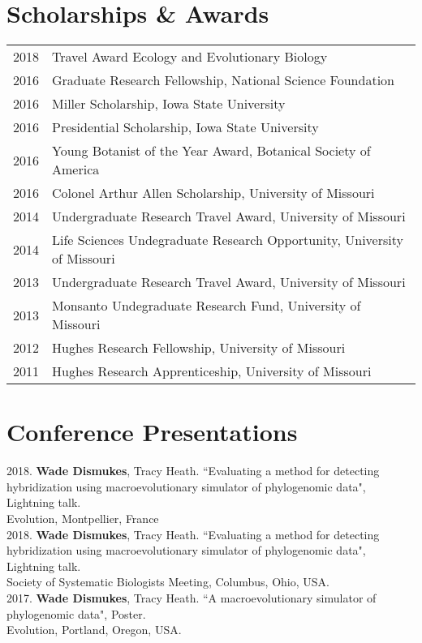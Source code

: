 \documentclass[12pt]{article}
\begin{document}
\section{Scholarships \& Awards}
\begin{tabular}{rl}
 2018 & Travel Award Ecology and Evolutionary Biology \\
 2016 & Graduate Research Fellowship, National Science Foundation \\
 2016 & Miller Scholarship, Iowa State University \\ 
 2016 & Presidential Scholarship, Iowa State University \\
 2016 & Young Botanist of the Year Award, Botanical Society of America \\ 
 2016 & Colonel Arthur Allen Scholarship, University of Missouri \\
 2014 & Undergraduate Research Travel Award, University of Missouri \\
 2014 & Life Sciences Undegraduate Research Opportunity,  University of Missouri \\
 2013 & Undergraduate Research Travel Award, University of Missouri \\
 2013 & Monsanto Undegraduate Research Fund,  University of Missouri \\
 2012 & Hughes Research Fellowship,  University of Missouri \\
 2011 & Hughes Research Apprenticeship,  University of Missouri \\

\end{tabular}

\section{Conference Presentations}
2018. \textbf{Wade Dismukes}, Tracy Heath. ``Evaluating a method for detecting hybridization using macroevolutionary simulator of phylogenomic data", Lightning talk. \\
Evolution, Montpellier, France \\

2018. \textbf{Wade Dismukes}, Tracy Heath. ``Evaluating a method for detecting hybridization using macroevolutionary simulator of phylogenomic data", Lightning talk. \\
Society of Systematic Biologists Meeting, Columbus, Ohio, USA. \\

2017. \textbf{Wade Dismukes}, Tracy Heath. ``A macroevolutionary simulator of phylogenomic data", Poster.\\ Evolution, Portland, Oregon, USA. \\
\end{document}

